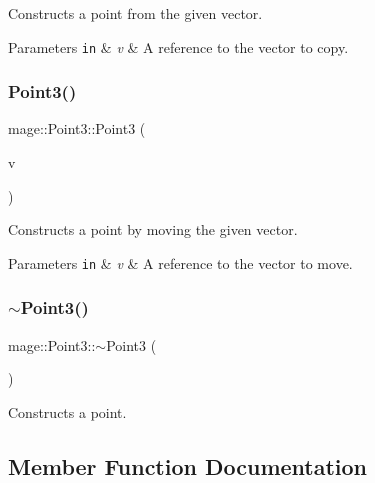 Constructs a point from the given vector.


\begin{DoxyParams}[1]{Parameters}
\mbox{\tt in}  & {\em v} & A reference to the vector to copy. \\
\hline
\end{DoxyParams}
\hypertarget{structmage_1_1_point3_ad28d286384f8ce89c6bc25471ec78cff}{}\label{structmage_1_1_point3_ad28d286384f8ce89c6bc25471ec78cff} 
\subsubsection{\texorpdfstring{Point3()}{Point3()}\hspace{0.1cm}{\footnotesize\ttfamily [6/6]}}
{\footnotesize\ttfamily mage\+::\+Point3\+::\+Point3 (\begin{DoxyParamCaption}\item[{X\+M\+F\+L\+O\+A\+T3 \&\&}]{v }\end{DoxyParamCaption})\hspace{0.3cm}{\ttfamily [explicit]}}

Constructs a point by moving the given vector.


\begin{DoxyParams}[1]{Parameters}
\mbox{\tt in}  & {\em v} & A reference to the vector to move. \\
\hline
\end{DoxyParams}
\hypertarget{structmage_1_1_point3_a952151b6ff72b68569f95445c2ac2495}{}\label{structmage_1_1_point3_a952151b6ff72b68569f95445c2ac2495} 
\subsubsection{\texorpdfstring{$\sim$\+Point3()}{~Point3()}}
{\footnotesize\ttfamily mage\+::\+Point3\+::$\sim$\+Point3 (\begin{DoxyParamCaption}{ }\end{DoxyParamCaption})\hspace{0.3cm}{\ttfamily [default]}}

Constructs a point. 

\subsection{Member Function Documentation}
\hypertarget{structmage_1_1_point3_a53403b16c67a6c7d72910edaec04e371}{}\label{structmage_1_1_point3_a53403b16c67a6c7d72910edaec04e371} 
